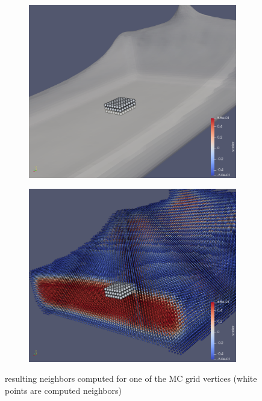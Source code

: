 \begin{figure}[H]
    \begin{subfigure}[b]{0.5\textwidth}
           \includegraphics[width=\textwidth]{figures/NeighborsComputation.png}
    \end{subfigure}
    \begin{subfigure}[b]{0.5\textwidth}
           \includegraphics[width=\textwidth]{figures/NeighborsComputation2.png}
    \end{subfigure}

    \caption{resulting neighbors computed for one of the MC grid vertices (white points are computed neighbors)}
    \label{fig:nghbrs_computation}
\end{figure}

